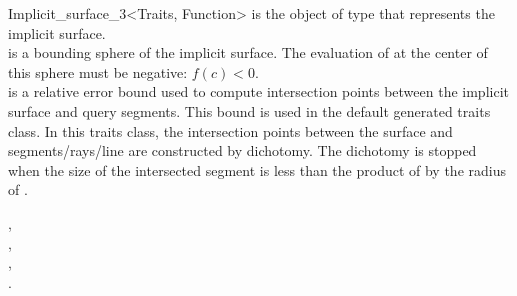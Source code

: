 \begin{ccRefClass}{Implicit_surface_3<Traits, Function>}
{ is the object of type  that represents the implicit
  surface.\\
  is a bounding sphere of the implicit surface. The
 evaluation of  at the center  of this sphere must be
 negative: $f(c)<0$.\\
  is a relative error bound 
used to  compute intersection points between the implicit surface
and  query segments. This bound is used in  the default generated traits class.
In this traits class, the intersection points between
the surface and segments/rays/line are constructed by dichotomy. The
dichotomy is stopped when the size of the intersected
segment  is less than the  product of  by the
radius of .}

\ccSeeAlso
{},\\
,\\
, \\
.

\end{ccRefClass}


